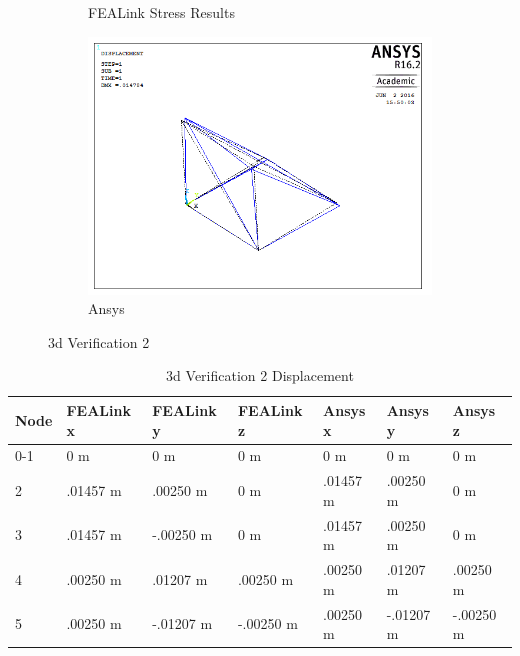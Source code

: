 \documentclass[11pt, oneside]{article}   	%
\begin{document}
\begin{figure}[H]
\begin{subfigure}[b]{.45\textwidth}
    \caption{FEALink Stress Results}
    \label{fig:3dV2FEALink2}
  \end{subfigure}
  \begin{subfigure}[b]{0.45\textwidth}
    \includegraphics[width=\textwidth]{Verification/Ansys/3dVerification2.png}
    \caption{Ansys}
    \label{fig:3dV2Ansys}
  \end{subfigure}
\caption{3d Verification 2}
\label{fig:3dVerification2}%
\end{figure}

\begin{table}[h]
\centering
\caption{3d Verification 2 Displacement}
\label{table:3dV2}
\begin{tabular}{l|l|l|l|l|l|l}
Node & FEALink x & FEALink y & FEALink z & Ansys x  & Ansys y   & Ansys z   \\ \hline
0-1  & 0 m       & 0 m       & 0 m       & 0 m      & 0 m       & 0 m       \\
2    & .01457 m  & .00250 m  & 0 m       & .01457 m & .00250 m  & 0 m       \\
3    & .01457 m  & -.00250 m & 0 m       & .01457 m & .00250 m  & 0 m       \\
4    & .00250 m  & .01207 m  & .00250 m  & .00250 m & .01207 m  & .00250 m  \\
5    & .00250 m  & -.01207 m & -.00250 m & .00250 m & -.01207 m & -.00250 m
\end{tabular}
\end{table}
\end{document}
